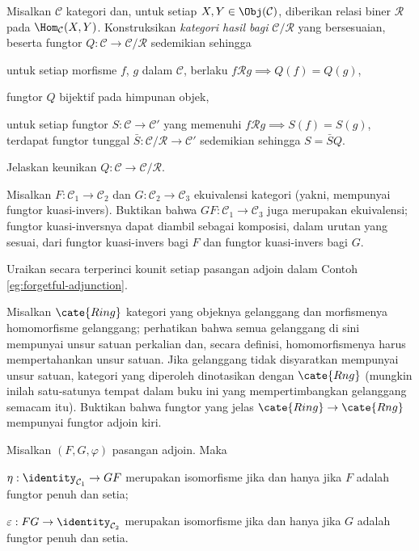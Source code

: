 \begin{Exercises}
	\item Misalkan $\mathcal{C}$ kategori dan, untuk setiap $X, Y \in \Obj(\mathcal{C})$, diberikan relasi biner $\mathcal{R}$ pada $\Hom_{\mathcal{C}}(X,Y)$. Konstruksikan \emph{kategori hasil bagi} $\mathcal{C}/\mathcal{R}$ yang bersesuaian, beserta fungtor $Q: \mathcal{C} \to \mathcal{C}/\mathcal{R}$ sedemikian sehingga
		\begin{compactitem}
			\item untuk setiap morfisme $f$, $g$ dalam $\mathcal{C}$, berlaku $f \mathcal{R} g \implies Q(f)=Q(g)$,
			\item fungtor $Q$ bijektif pada himpunan objek,
			\item untuk setiap fungtor $S: \mathcal{C} \to \mathcal{C}'$ yang memenuhi $f \mathcal{R} g \implies S(f)=S(g)$, terdapat fungtor tunggal $\bar{S}: \mathcal{C}/\mathcal{R} \to \mathcal{C}'$ sedemikian sehingga $S = \bar{S} Q$.
		\end{compactitem}
		Jelaskan keunikan $Q: \mathcal{C} \to \mathcal{C}/\mathcal{R}$.
	\item Misalkan $F: \mathcal{C}_1 \to \mathcal{C}_2$ dan $G: \mathcal{C}_2 \to \mathcal{C}_3$ ekuivalensi kategori (yakni, mempunyai fungtor kuasi-invers). Buktikan bahwa $GF: \mathcal{C}_1 \to \mathcal{C}_3$ juga merupakan ekuivalensi; fungtor kuasi-inversnya dapat diambil sebagai komposisi, dalam urutan yang sesuai, dari fungtor kuasi-invers bagi $F$ dan fungtor kuasi-invers bagi $G$.
	\item Uraikan secara terperinci kounit setiap pasangan adjoin dalam Contoh \ref{eg:forgetful-adjunction}.
	\item Misalkan $\cate{Ring}$ kategori yang objeknya gelanggang dan morfismenya homomorfisme gelanggang; perhatikan bahwa semua gelanggang di sini mempunyai unsur satuan perkalian dan, secara definisi, homomorfismenya harus mempertahankan unsur satuan. Jika gelanggang tidak disyaratkan mempunyai unsur satuan, kategori yang diperoleh dinotasikan dengan $\cate{Rng}$ (mungkin inilah satu-satunya tempat dalam buku ini yang mempertimbangkan gelanggang semacam itu). Buktikan bahwa fungtor yang jelas $\cate{Ring} \to \cate{Rng}$ mempunyai fungtor adjoin kiri.
	\item Misalkan $(F, G, \varphi)$ pasangan adjoin. Maka
		\begin{inparaenum}[(i)]
			\item $\eta: \identity_{\mathcal{C}_1} \to GF$ merupakan isomorfisme jika dan hanya jika $F$ adalah fungtor penuh dan setia;
			\item $\varepsilon: FG \to \identity_{\mathcal{C}_2}$ merupakan isomorfisme jika dan hanya jika $G$ adalah fungtor penuh dan setia.

\end{inparaenum}
\end{Exercises}
